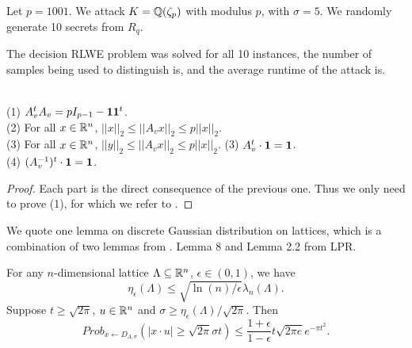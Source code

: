 \documentclass{amsart}
\begin{document}
\begin{Example}
Let $p = 1001$. We attack $K = \mathbb{Q}(\zeta_p)$ with modulus $p$, with $\sigma = 5$. We randomly generate 10 secrets from $R_q$.

The decision RLWE problem was solved for all 10 instances, the number of samples being used to distinguish is, and the average runtime of the attack is.
\end{Example}

\begin{Lemma} \qquad \\
(1) $A_v^t A_v = pI_{p-1} - {\bf 1} {\bf 1}^t$.\\
(2) For all $x \in \mathbb{R}^n$, $||x||_2 \leq ||A_v x||_2 \leq p||x||_2$. \\
(3) For all $x \in \mathbb{R}^n$, $||y||_2 \leq ||A_v x||_2 \leq p||x||_2$.
(3) $A_v^t \cdot {\bf 1} = {\bf 1}$. \\
(4) $(A_v^{-1})^t \cdot {\bf 1} = {\bf 1}$.
\end{Lemma}

\begin{proof}
Each part is the direct consequence of the previous one. Thus we only need to prove (1), for which we refer to \cite{ducas2012ring}.
\end{proof}



\iffalse
We quote one lemma on discrete Gaussian distribution on lattices, which is a combination of two lemmas from \cite{langlois2014worst}. Lemma 8 and Lemma 2.2  from LPR.
\begin{Lemma}
\label{lem: last}
For any $n$-dimensional lattice $\Lambda \subseteq \mathbb{R}^n$, $\epsilon \in (0,1)$, we have
$$\eta_\epsilon(\Lambda) \leq \sqrt{\ln(n)/\epsilon} \lambda_n(\Lambda).$$
Suppose $t \geq \sqrt{2 \pi}$, $u \in \mathbb{R}^n$ and $\sigma \geq \eta_\epsilon(\Lambda)/\sqrt{2 \pi}$. Then
\[
    Prob_{x \gets D_{\Lambda,\sigma}}(|x \cdot u| \geq \sqrt{2 \pi}\sigma t) \leq \frac{1+\epsilon}{1-\epsilon} t \sqrt{2 \pi e} e^{- \pi t^2}.
\]
\end{Lemma}
\end{document}
